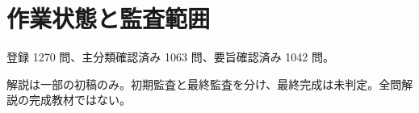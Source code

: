 \chapter{作業状態と監査範囲}
登録 1270 問、主分類確認済み 1063 問、要旨確認済み 1042 問。
\par 解説は一部の初稿のみ。初期監査と最終監査を分け、最終完成は未判定。全問解説の完成教材ではない。
